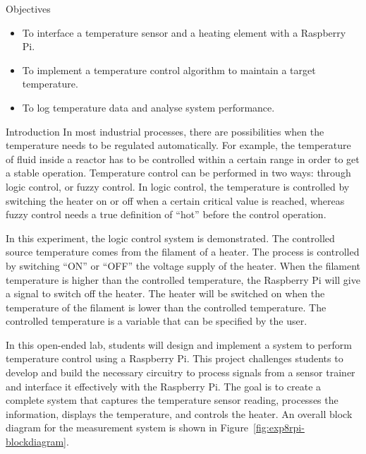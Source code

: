 
\begin{labsection}{Objectives}
  \begin{itemize}
    \item To interface a temperature sensor and a heating element with a Raspberry Pi.
    \item To implement a temperature control algorithm to maintain a target temperature.
    \item To log temperature data and analyse system performance.
  \end{itemize}
\end{labsection}

\begin{labsection}{Introduction}
  In most industrial processes, there are possibilities when the temperature needs to be regulated automatically. For example, the temperature of fluid inside a reactor has to be controlled within a certain range in order to get a stable operation. Temperature control can be performed in two ways: through logic control, or fuzzy control. In logic control, the temperature is controlled by switching the heater on or off when a certain critical value is reached, whereas fuzzy control needs a true definition of ``hot'' before the control operation.
  \vspace*{1.5em}

  In this experiment, the logic control system is demonstrated. The controlled source temperature comes from the filament of a heater. The process is controlled by switching ``ON'' or ``OFF'' the voltage supply of the heater. When the filament temperature is higher than the controlled temperature, the Raspberry Pi will give a signal to switch off the heater. The heater will be switched on when the temperature of the filament is lower than the controlled temperature. The controlled temperature is a variable that can be specified by the user.
  \vspace*{1.5em}

  In this open-ended lab, students will design and implement a system to perform temperature control using a Raspberry Pi. This project challenges students to develop and build the necessary circuitry to process signals from a sensor trainer and interface it effectively with the Raspberry Pi. The goal is to create a complete system that captures the temperature sensor reading, processes the information, displays the temperature, and controls the heater. An overall block diagram for the measurement system is shown in Figure~\ref{fig:exp8rpi-blockdiagram}.
\end{labsection}

